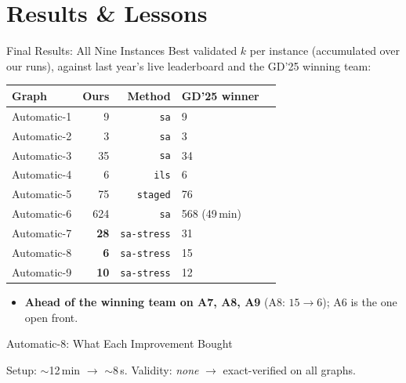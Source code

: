 \section{Results \& Lessons}

\begin{frame}{Final Results: All Nine Instances}
  Best validated $k$ per instance (accumulated over our runs), against last year's
  live leaderboard and the GD'25 winning team:
  \begin{center}
    \footnotesize
    \begin{tabular}{lrrll}
      \toprule
      \textbf{Graph} & \textbf{Ours} & \textbf{Method} & \textbf{GD'25 winner} \\
      \midrule
      Automatic-1 & 9   & \texttt{sa}        & 9   \\
      Automatic-2 & 3   & \texttt{sa}        & 3   \\
      Automatic-3 & 35  & \texttt{sa}        & 34   \\
      Automatic-4 & 6   & \texttt{ils}       & 6   \\
      Automatic-5 & 75  & \texttt{staged}    & 76   \\
      Automatic-6 & 624 & \texttt{sa}        & 568 (49\,min) \\
      Automatic-7 & \textbf{28}  & \texttt{sa-stress}   & 31   \\
      Automatic-8 & \textbf{6}   & \texttt{sa-stress}   & 15   \\
      Automatic-9 & \textbf{10}  & \texttt{sa-stress}   & 12   \\
      \bottomrule
    \end{tabular}
  \end{center}
  \smallskip
  \begin{itemize}
    \item \textbf{Ahead of the winning team on A7, A8, A9} (A8: $15 \to 6$);
          A6 is the one open front.
  \end{itemize}
\end{frame}

\begin{frame}{Automatic-8: What Each Improvement Bought}
  \centering
{}

  \smallskip
  Setup: $\sim$12\,min $\to$ $\sim$8\,s. Validity: \emph{none} $\to$ exact-verified on all graphs.
\end{frame}


